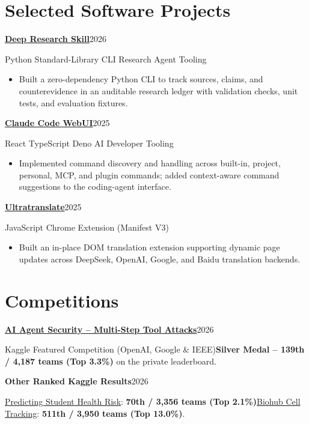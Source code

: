 \documentclass[10pt,a4paper]{article}
\newcommand{\entry}[2]{\needspace{3\baselineskip}\textbf{#1}\hfill{\small\textcolor{accent}{#2}}\par}
\newcommand{\detail}[1]{{\fontsize{9.5}{11.2}\selectfont\textcolor{muted}{#1}\par}}
\newcommand{\gap}{\vspace{3.2pt}}
\begin{document}
\section*{Selected Software Projects}
\entry{\href{https://github.com/B143KC47/deep-research-skill}{Deep Research Skill}}{2026}
\detail{Python \textbar{} Standard-Library CLI \textbar{} Research Agent Tooling}
\begin{itemize}
  \item Built a zero-dependency Python CLI to track sources, claims, and counterevidence in an auditable research ledger with validation checks, unit tests, and evaluation fixtures.
\end{itemize}
\gap
\entry{\href{https://github.com/B143KC47/claudeCO-webui}{Claude Code WebUI}}{2025}
\detail{React \textbar{} TypeScript \textbar{} Deno \textbar{} AI Developer Tooling}
\begin{itemize}
  \item Implemented command discovery and handling across built-in, project, personal, MCP, and plugin commands; added context-aware command suggestions to the coding-agent interface.
\end{itemize}
\gap
\entry{\href{https://github.com/B143KC47/Ultratranslate}{Ultratranslate}}{2025}
\detail{JavaScript \textbar{} Chrome Extension (Manifest V3)}
\begin{itemize}
  \item Built an in-place DOM translation extension supporting dynamic page updates across DeepSeek, OpenAI, Google, and Baidu translation backends.
\end{itemize}

\section*{Competitions}
\entry{\href{https://www.kaggle.com/competitions/ai-agent-security-multi-step-tool-attacks}{AI Agent Security -- Multi-Step Tool Attacks}}{2026}
\detail{Kaggle Featured Competition (OpenAI, Google \& IEEE)\enspace\textbar{}\enspace\textbf{Silver Medal -- 139th / 4,187 teams (Top 3.3\%)} on the private leaderboard.}
\gap
\entry{Other Ranked Kaggle Results}{2026}
\detail{\href{https://www.kaggle.com/competitions/playground-series-s6e7}{Predicting Student Health Risk}: \textbf{70th / 3,356 teams (Top 2.1\%)}\enspace\textbar{}\enspace\href{https://www.kaggle.com/competitions/biohub-cell-tracking-during-development}{Biohub Cell Tracking}: \textbf{511th / 3,950 teams (Top 13.0\%)}.}
\end{document}

